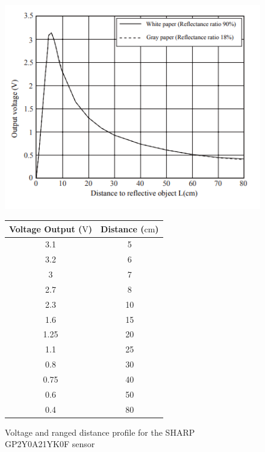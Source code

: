 \documentclass[a4paper]{article}
\begin{document}
\begin{figure}[h]
\centering
\begin{minipage}[c]{0.45\textwidth}
\centering
\includegraphics[scale=0.5]{GP2Y_long}
\caption{Voltage and ranged distance profile for the SHARP GP2Y0A21YK0F sensor}
\end{minipage}
\hspace{1cm}
\begin{minipage}{0.45\textwidth}
\centering
{}
\begin{tabular}[c]{cc}
\toprule
\textbf{Voltage Output ($\si{\volt}$)} & \textbf{Distance ($\si{\centi\meter}$)}\\
\midrule
3.1 & 5\\
3.2 & 6\\
3 & 7\\
2.7 & 8\\
2.3 & 10\\
1.6 & 15\\
1.25 & 20\\
1.1 & 25\\
0.8 & 30\\
0.75 & 40\\
0.6 & 50\\
0.4 & 80\\
\bottomrule
\end{tabular}
\end{minipage}
\end{figure}

\clearpage
\end{document}
